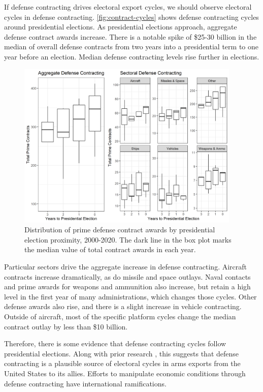 \documentclass[12pt]{article}
\begin{document}
If defense contracting drives electoral export cycles, we should observe electoral cycles in defense contracting.
\autoref{fig:contract-cycles} shows defense contracting cycles around presidential elections. 
As presidential elections approach, aggregate defense contract awards increase. 
There is a notable spike of \$25-30 billion in the median of overall defense contracts from two years into a presidential term to one year before an election. 
Median defense contracting levels rise further in elections.


\begin{figure}[htpb]
	\centering
		\includegraphics[width=0.95\textwidth]{../figures/contract-cycles.png}
	\caption{Distribution of prime defense contract awards by presidential election proximity, 2000-2020. The dark line in the box plot marks the median value of total contract awards in each year.}
	\label{fig:contract-cycles}
\end{figure}


Particular sectors drive the aggregate increase in defense contracting. 
Aircraft contracts increase dramatically, as do missile and space outlays. 
Naval contacts and prime awards for weapons and ammunition also increase, but retain a high level in the first year of many administrations, which changes those cycles. 
Other defense awards also rise, and there is a slight increase in vehicle contracting. 
Outside of aircraft, most of the specific platform cycles change the median contract outlay by less than \$10 billion.


Therefore, there is some evidence that defense contracting cycles follow presidential elections.
Along with prior research \citep{DerouenHeo2000}, this suggests that defense contracting is a plausible source of electoral cycles in arms exports from the United States to its allies.
Efforts to manipulate economic conditions through defense contracting have international ramifications. 
\end{document}
